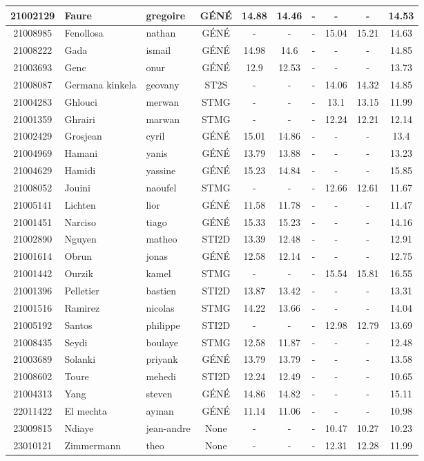 \documentclass{article}%
\begin{document}
\begin{tabular}{|c|l|l|c|c|c|c|c|c|c|}
\hline%
21002129&Faure&gregoire&GÉNÉ&14.88&14.46&{-}&{-}&{-}&14.53\\%
\hline%
21008985&Fenollosa&nathan&GÉNÉ&{-}&{-}&{-}&15.04&15.21&14.63\\%
\hline%
21008222&Gada&ismail&GÉNÉ&14.98&14.6&{-}&{-}&{-}&14.85\\%
\hline%
21003693&Genc&onur&GÉNÉ&12.9&12.53&{-}&{-}&{-}&13.73\\%
\hline%
21008087&Germana kinkela&geovany&ST2S&{-}&{-}&{-}&14.06&14.32&14.85\\%
\hline%
21004283&Ghlouci&merwan&STMG&{-}&{-}&{-}&13.1&13.15&11.99\\%
\hline%
21001359&Ghrairi&marwan&STMG&{-}&{-}&{-}&12.24&12.21&12.14\\%
\hline%
21002429&Grosjean&cyril&GÉNÉ&15.01&14.86&{-}&{-}&{-}&13.4\\%
\hline%
21004969&Hamani&yanis&GÉNÉ&13.79&13.88&{-}&{-}&{-}&13.23\\%
\hline%
21004629&Hamidi&yassine&GÉNÉ&15.23&14.84&{-}&{-}&{-}&15.85\\%
\hline%
21008052&Jouini&naoufel&STMG&{-}&{-}&{-}&12.66&12.61&11.67\\%
\hline%
21005141&Lichten&lior&GÉNÉ&11.58&11.78&{-}&{-}&{-}&11.47\\%
\hline%
21001451&Narciso&tiago&GÉNÉ&15.33&15.23&{-}&{-}&{-}&14.16\\%
\hline%
21002890&Nguyen&matheo&STI2D&13.39&12.48&{-}&{-}&{-}&12.91\\%
\hline%
21001614&Obrun&jonas&GÉNÉ&12.58&12.14&{-}&{-}&{-}&12.75\\%
\hline%
21001442&Ourzik&kamel&STMG&{-}&{-}&{-}&15.54&15.81&16.55\\%
\hline%
21001396&Pelletier&bastien&STI2D&13.87&13.42&{-}&{-}&{-}&13.31\\%
\hline%
21001516&Ramirez&nicolas&STMG&14.22&13.66&{-}&{-}&{-}&14.04\\%
\hline%
21005192&Santos&philippe&STI2D&{-}&{-}&{-}&12.98&12.79&13.69\\%
\hline%
21008435&Seydi&boulaye&STMG&12.58&11.87&{-}&{-}&{-}&12.48\\%
\hline%
21003689&Solanki&priyank&GÉNÉ&13.79&13.79&{-}&{-}&{-}&13.58\\%
\hline%
21008602&Toure&mehedi&STI2D&12.24&12.49&{-}&{-}&{-}&10.65\\%
\hline%
21004313&Yang&steven&GÉNÉ&14.86&14.82&{-}&{-}&{-}&15.11\\%
\hline%
22011422&El mechta&ayman&GÉNÉ&11.14&11.06&{-}&{-}&{-}&10.98\\%
\hline%
23009815&Ndiaye&jean{-}andre&None&{-}&{-}&{-}&10.47&10.27&10.23\\%
\hline%
23010121&Zimmermann&theo&None&{-}&{-}&{-}&12.31&12.28&11.99\\%
\hline%
\end{tabular}
\end{document}
